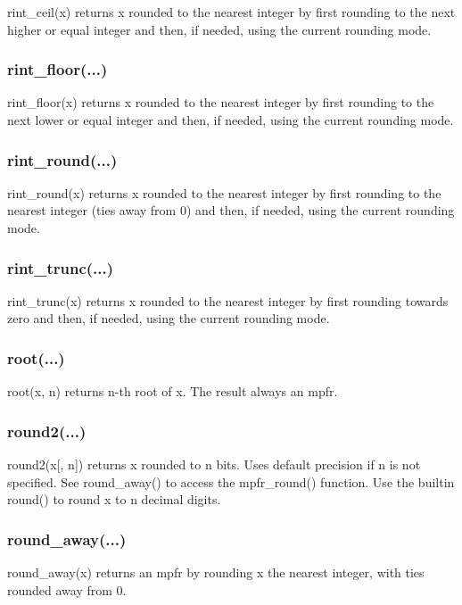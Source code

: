 rint\_ceil(x) returns x rounded to the nearest integer by first rounding to the next higher or equal
integer and then, if needed, using the current rounding mode.

\subsubsection{rint\_floor(...)}

rint\_floor(x) returns x rounded to the nearest integer by first rounding to the next lower or equal
integer and then, if needed, using the current rounding mode.

\subsubsection{rint\_round(...)}

rint\_round(x) returns x rounded to the nearest integer by first rounding to the nearest integer
(ties away from 0) and then, if needed, using the current rounding mode.

\subsubsection{rint\_trunc(...)}

rint\_trunc(x) returns x rounded to the nearest integer by first rounding towards zero and then, if
needed, using the current rounding mode.

\subsubsection{root(...)}

root(x, n) returns n-th root of x. The result always an mpfr.

\subsubsection{round2(...)}

round2(x[, n]) returns x rounded to n bits. Uses default precision if n is not specified. See
round\_away() to access the mpfr\_round() function. Use the builtin round() to round x to n
decimal digits.

\subsubsection{round\_away(...)}

round\_away(x) returns an mpfr by rounding x the nearest integer, with ties rounded away from 0.

